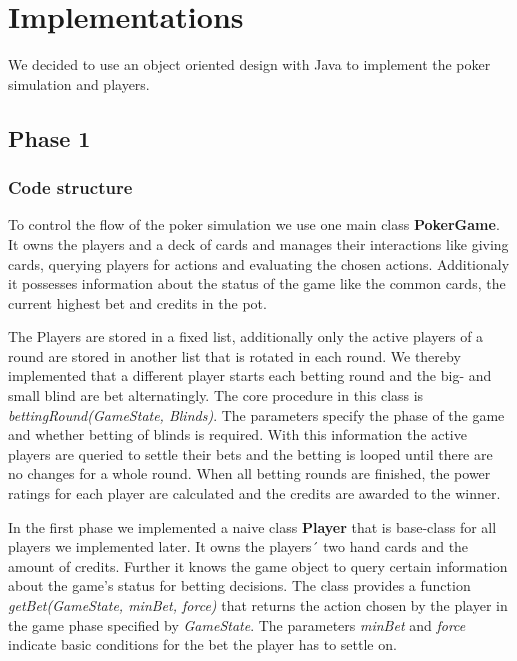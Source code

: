 

\section{Implementations}

We decided to use an object oriented design with Java to implement the poker simulation and players.

\subsection{Phase 1}

\subsubsection{Code structure}

To control the flow of the poker simulation we use one main class \textbf{PokerGame}.
It owns the players and a deck of cards and manages their interactions like giving cards, querying players for actions
and evaluating the chosen actions. Additionaly it possesses information about the status of the game like the common
cards, the current highest bet and credits in the pot.

The Players are stored in a fixed list, additionally only the active players of a round are stored in another list that
is rotated in each round. We thereby implemented that a different player starts each betting round and the big- and
small blind are bet alternatingly. The core procedure in this class is \textit{bettingRound(GameState, Blinds)}. The
parameters specify the phase of the game and whether betting of blinds is required. With this information the active players are
queried to settle their bets and the betting is looped until there are no changes for a whole round. When all betting
rounds are finished, the power ratings for each player are calculated and the credits are awarded to the winner.

In the first phase we implemented a naive class \textbf{Player} that is base-class for all players we implemented later.
It owns the players´ two hand cards and the amount of credits. Further it knows the game object to query certain
information about the game's status for betting decisions. The class provides a function \textit{getBet(GameState, minBet,
force)} that returns the action chosen by the player in the game phase specified by \textit{GameState}. The parameters
\textit{minBet} and \textit{force} indicate basic conditions for the bet the player has to settle on.

